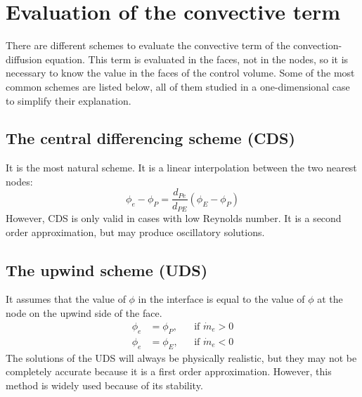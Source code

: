 \section{Evaluation of the convective term}
There are different schemes to evaluate the convective term of the convection-diffusion equation. This term is evaluated in the faces, not in the nodes, so it is necessary to know the value in the faces of the control volume. Some of the most common schemes are listed below\cite{Patankar1980,Ferziger2002}, all of them studied in a one-dimensional case to simplify their explanation.

\subsection{The central differencing scheme (CDS)}
It is the most natural scheme. It is a linear interpolation between the two nearest nodes:
\begin{equation}
\phi_{e}-\phi_{P}=\frac{d_{Pe}}{d_{PE}}\left(\phi_{E}-\phi_{P}\right)
\end{equation}
However, CDS is only valid in cases with low Reynolds number. It is a second order approximation, but may produce oscillatory solutions.

\subsection{The upwind scheme (UDS)}
It assumes that the value of $\phi$ in the interface is equal to the value of $\phi$ at the node on the upwind side of the face.
\begin{equation}
\begin{aligned}
\phi_ {e} &=\phi_{P},&&\text{if $\dot{m}_{e}>0$}\\    \phi_ {e} &=\phi_{E},&&\text{if $\dot{m}_{e}<0$}
\end{aligned}
\end{equation}
The solutions of the UDS will always be physically realistic, but they may not be completely accurate because it is a first order approximation. However, this method is widely used because of its stability.

